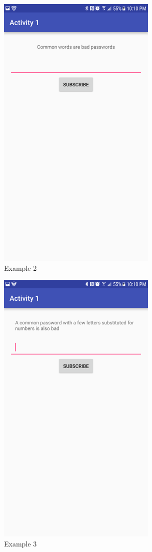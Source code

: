\documentclass{article}
\begin{document}
\begin{figure}[ht]
      \includegraphics[width=3in]{img/t3s2.png}
      \centering
      \caption{Example 2}
\end{figure}
\begin{figure}[ht]
      \includegraphics[width=3in]{img/t3s3.png}
      \centering
      \caption{Example 3}
\end{figure}
\end{document}
